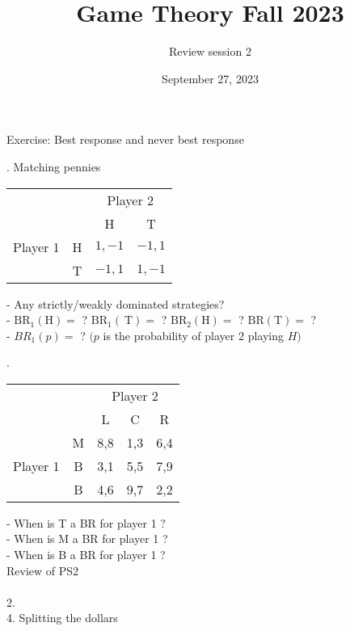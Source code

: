 \documentclass{article}
\title{Game Theory Fall 2023}
\author{Review session 2}
\date{September 27, 2023}
\begin{document}
\maketitle
\noindent Exercise: Best response and never best response
\vspace*{1\baselineskip}

. Matching pennies
\vspace*{1\baselineskip}

\begin{tabular}{cccc} 
& & \multicolumn{2}{c}{ Player 2 } \\
&  & H & T \\
Player 1&  H& $1,-1$ & $-1,1$ \\
& T& $-1,1$ & $1,-1$
\end{tabular}
\vspace*{1\baselineskip}

\noindent - Any strictly/weakly dominated strategies?
\\- $\mathrm{BR}_1(\mathrm{H})=$ ? $\mathrm{BR}_1(\mathrm{~T})=$ ? $\mathrm{BR}_2(\mathrm{H})=$ ? $\mathrm{BR}(\mathrm{T})=$ ?
\\- $B R_1(p)=$ ? $(p$ is the probability of player 2 playing $H)$\\
\vspace*{6\baselineskip}

. \\
\begin{tabular}{ccccc} 
& & \multicolumn{3}{c}{ Player 2 } \\
& & L & C & R \\
 & M & 8,8 & 1,3 & 6,4 \\
Player 1 & B & 3,1 & 5,5 & 7,9 \\
& B & 4,6 & 9,7 & 2,2
\end{tabular}
\vspace*{1\baselineskip}

\noindent- When is T a BR for player 1 ?
\\- When is $\mathrm{M}$ a BR for player 1 ?
\\- When is B a BR for player 1 ?\\
\newpage
Review of PS2\\\\
2. 
\\
4. Splitting the dollars
\end{document}
